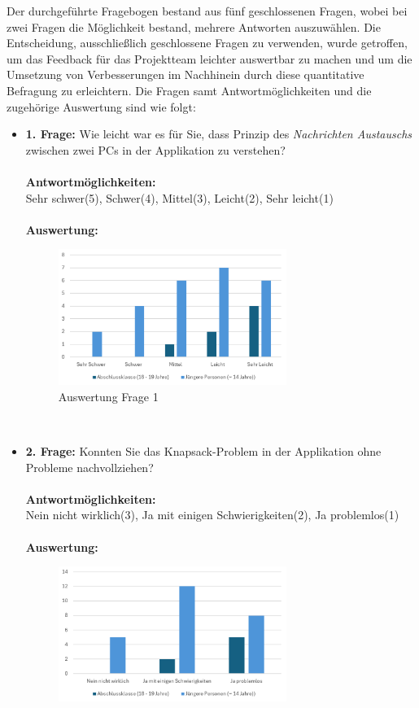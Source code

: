 Der durchgeführte Fragebogen bestand aus fünf geschlossenen Fragen, wobei bei zwei Fragen die Möglichkeit bestand, mehrere
Antworten auszuwählen. Die Entscheidung, ausschließlich geschlossene Fragen zu verwenden, wurde getroffen, um das Feedback
für das Projektteam leichter auswertbar zu machen und um die Umsetzung von Verbesserungen im Nachhinein durch diese quantitative
Befragung zu erleichtern. Die Fragen samt Antwortmöglichkeiten und die zugehörige Auswertung sind wie folgt:
\begin{itemize}
    \item \textbf{1. Frage:} Wie leicht war es für Sie, dass Prinzip des \textit{Nachrichten Austauschs} zwischen zwei PCs in der Applikation zu verstehen?
    \\
    \\
    \textbf{Antwortmöglichkeiten:} \\
    Sehr schwer(5), Schwer(4), Mittel(3), Leicht(2), Sehr leicht(1)
    \\
    \\
    \textbf{Auswertung:}
    \begin{figure}[H]
        \centering
        \includegraphics[width=0.7\textwidth]{images/AuswertungFrage1}
        \caption{Auswertung Frage 1}
        \label{fig:fr1}
    \end{figure}
    \\
    \item \textbf{2. Frage:} Konnten Sie das Knapsack-Problem in der Applikation ohne Probleme nachvollziehen?
    \\
    \\
    \textbf{Antwortmöglichkeiten:}\\
    Nein nicht wirklich(3), Ja mit einigen Schwierigkeiten(2), Ja problemlos(1)
    \\
    \\
    \textbf{Auswertung:}
    \begin{figure}[H]
        \centering
        \includegraphics[width=0.7\textwidth]{images/AuswertungFrage2}

\end{figure}
\end{itemize}
